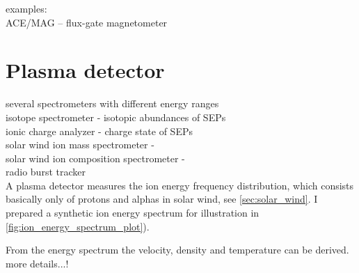 examples:\\
ACE/MAG -- flux-gate magnetometer\\


\section{Plasma detector}

several spectrometers with different energy ranges\\

isotope spectrometer - isotopic abundances of SEPs\\
ionic charge analyzer - charge state of SEPs\\
solar wind ion mass spectrometer - \\
solar wind ion composition spectrometer - \\
radio burst tracker\\


A plasma detector measures the ion energy frequency distribution, which consists basically only of protons and alphas in solar wind, see \autoref{sec:solar_wind}. I prepared a synthetic ion energy spectrum for illustration in \autoref{fig:ion_energy_spectrum_plot}).\\
\begin{figure}[htb]
\end{figure}


From the energy spectrum the velocity, density and temperature can be derived.\\
more details...!\\

